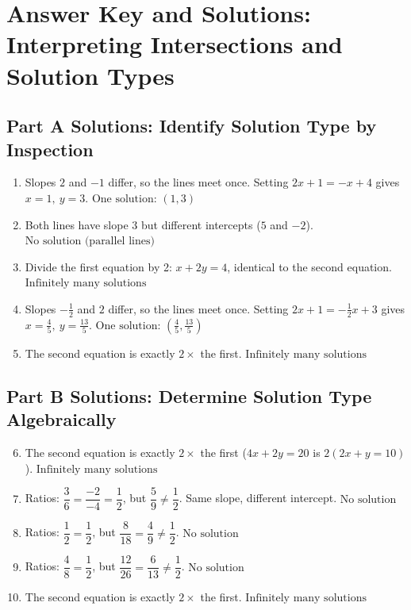 \documentclass[14pt]{extarticle}
\begin{document}
\newpage


\section*{Answer Key and Solutions: Interpreting Intersections and Solution Types}

\subsection*{Part A Solutions: Identify Solution Type by Inspection}
\begin{enumerate}
    \item Slopes \(2\) and \(-1\) differ, so the lines meet once. Setting \(2x+1=-x+4\) gives \(x=1,\ y=3\). \(\boxed{\text{One solution: } (1,3)}\)
    \item Both lines have slope \(3\) but different intercepts (\(5\) and \(-2\)). \(\boxed{\text{No solution (parallel lines)}}\)
    \item Divide the first equation by 2: \(x+2y=4\), identical to the second equation. \(\boxed{\text{Infinitely many solutions}}\)
    \item Slopes \(-\tfrac12\) and \(2\) differ, so the lines meet once. Setting \(2x+1=-\tfrac12x+3\) gives \(x=\tfrac{4}{5},\ y=\tfrac{13}{5}\). \(\boxed{\text{One solution: } \left(\tfrac{4}{5}, \tfrac{13}{5}\right)}\)
    \item The second equation is exactly \(2\times\) the first. \(\boxed{\text{Infinitely many solutions}}\)
\end{enumerate}

\subsection*{Part B Solutions: Determine Solution Type Algebraically}
\begin{enumerate}
    \setcounter{enumi}{5}
    \item The second equation is exactly \(2\times\) the first (\(4x+2y=20\) is \(2(2x+y=10)\)). \(\boxed{\text{Infinitely many solutions}}\)
    \item Ratios: \(\dfrac{3}{6}=\dfrac{-2}{-4}=\dfrac12\), but \(\dfrac{5}{9}\neq\dfrac12\). Same slope, different intercept. \(\boxed{\text{No solution}}\)
    \item Ratios: \(\dfrac{1}{2}=\dfrac{1}{2}\), but \(\dfrac{8}{18}=\dfrac{4}{9}\neq\dfrac12\). \(\boxed{\text{No solution}}\)
    \item Ratios: \(\dfrac{4}{8}=\dfrac{1}{2}\), but \(\dfrac{12}{26}=\dfrac{6}{13}\neq\dfrac12\). \(\boxed{\text{No solution}}\)
    \item The second equation is exactly \(2\times\) the first. \(\boxed{\text{Infinitely many solutions}}\)
\end{enumerate}
\end{document}
